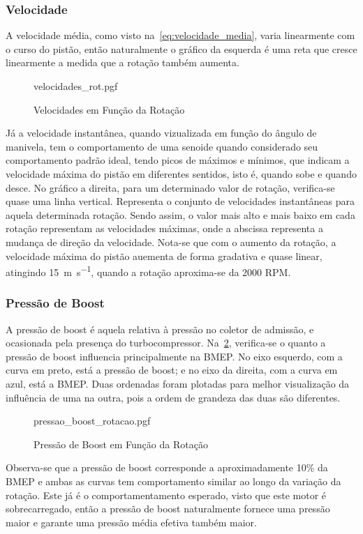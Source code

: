 \subsubsection*{Velocidade}

A velocidade média, como visto na~\cref{eq:velocidade_media}, varia linearmente com o curso do pistão, então naturalmente o gráfico da esquerda é uma reta que cresce linearmente a medida que a rotação também aumenta. 
%
\begin{figure}[!htb]
    \centering
    \caption{Velocidades em Função da Rotação}
    {velocidades_rot.pgf}
    \label{fig:velocidades_rot}
\end{figure}
%
Já a velocidade instantânea, quando vizualizada em função do ângulo de manivela, tem o comportamento de uma senoide quando considerado seu comportamento padrão ideal, tendo picos de máximos e mínimos, que indicam a velocidade máxima do pistão em diferentes sentidos, isto é, quando sobe e quando desce.
No gráfico a direita, para um determinado valor de rotação, verifica-se quase uma linha vertical.
Representa o conjunto de velocidades instantâneas para aquela determinada rotação. 
Sendo assim, o valor mais alto e mais baixo em cada rotação representam as velocidades máximas, onde a abscissa representa a mudança de direção da velocidade.
Nota-se que com o aumento da rotação, a velocidade máxima do pistão auementa de forma gradativa e quase linear, atingindo \SI{15}{m.s^{-1}}, quando a rotação aproxima-se da 2000 RPM.

\subsubsection*{Pressão de Boost}

A pressão de boost é aquela relativa à pressão no coletor de admissão, e ocasionada pela presença do turbocompressor. 
Na~\cref{fig:pressao_boost_rot}, verifica-se o quanto a pressão de boost influencia principalmente na BMEP. 
No eixo esquerdo, com a curva em preto, está a pressão de boost; e no eixo da direita, com a curva em azul, está a BMEP. 
Duas ordenadas foram plotadas para melhor visualização da influência de uma na outra, pois a ordem de grandeza das duas são diferentes.
%
\begin{figure}[!htb]
    \centering
    \caption{Pressão de Boost em Função da Rotação}
    {pressao_boost_rotacao.pgf}
    \label{fig:pressao_boost_rot}
\end{figure}
%
Observa-se que a pressão de boost corresponde a aproximadamente 10\% da BMEP e  ambas as curvas tem comportamento similar ao longo da variação da rotação. 
Este já é o comportamentamento esperado, visto que este motor é sobrecarregado, então a pressão de boost naturalmente fornece uma pressão maior e garante uma pressão média efetiva também maior.

